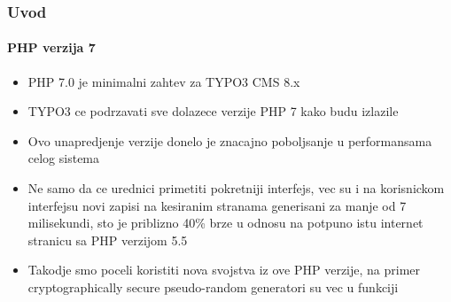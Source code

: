 \begin{frame}[fragile]
	\frametitle{Uvod}
	\framesubtitle{PHP verzija 7}

	\begin{itemize}

		\item PHP 7.0 je minimalni zahtev za TYPO3 CMS 8.x
		\item TYPO3 ce podrzavati sve dolazece verzije PHP 7 kako budu izlazile
		\item Ovo unapredjenje verzije donelo je znacajno poboljsanje u performansama celog sistema

		\item Ne samo da ce urednici primetiti pokretniji interfejs, vec su i na korisnickom interfejsu 
			novi zapisi na kesiranim stranama generisani za manje od 7 milisekundi,
			sto je priblizno 40\% brze u odnosu na potpuno istu internet stranicu sa PHP verzijom 5.5

		\item Takodje smo poceli koristiti nova svojstva iz ove PHP verzije, 
			na primer cryptographically secure pseudo-random generatori su vec u funkciji

	\end{itemize}

\end{frame}

